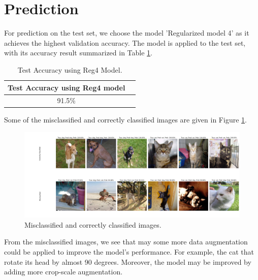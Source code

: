 \section{Prediction}
For prediction on the test set, we choose the model 'Regularized model 4' as it achieves the highest validation accuracy.
The model is applied to the test set, with its accuracy result summarized in Table \ref{tab:prediction}.

\begin{table}[H]
    \centering
    \begin{tabular}{|c|c|}
        \hline
        \textbf{Test Accuracy using Reg4 model} \\ \hline
        91.5\% \\ \hline
    \end{tabular}
    \caption{Test Accuracy using Reg4 Model.}
    \label{tab:prediction}
\end{table}

Some of the misclassified and correctly classified images are given in Figure \ref{fig:prediction}.
\begin{figure}[H]
    \vspace*{-0.7cm}
    \centering
    \includegraphics[width=1\textwidth]{figures/predict_images.png}
    \caption{Misclassified and correctly classified images.}
    \label{fig:prediction}
    \vspace*{-0.7cm}
\end{figure}

From the misclassified images, we see that may some more data augmentation could be applied to improve the model's performance.
For example, the cat that rotate its head by almost 90 degrees. Moreover, the model may be improved by adding more crop-scale augmentation.